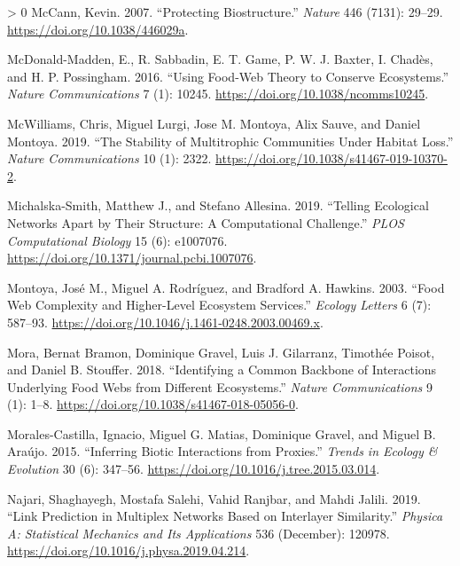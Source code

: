 \documentclass[11pt]{article}
\newlength{\cslhangindent}
\newenvironment{CSLReferences}[3] %
 {%
  \setlength{\parindent}{0pt}
  \ifodd #1 \everypar{\setlength{\hangindent}{\cslhangindent}}\ignorespaces\fi
  \ifnum #2 > 0
  \setlength{\parskip}{#2\baselineskip}
  \fi
 }%
 {}
\begin{document}
\begin{CSLReferences}{1}{0}
\leavevmode\hypertarget{ref-McCann2007ProBio}{}%
McCann, Kevin. 2007. {``Protecting Biostructure.''} \emph{Nature} 446
(7131): 29--29. \url{https://doi.org/10.1038/446029a}.

\leavevmode\hypertarget{ref-McDonald-Madden2016UsiFoo}{}%
McDonald-Madden, E., R. Sabbadin, E. T. Game, P. W. J. Baxter, I.
Chadès, and H. P. Possingham. 2016. {``Using Food-Web Theory to Conserve
Ecosystems.''} \emph{Nature Communications} 7 (1): 10245.
\url{https://doi.org/10.1038/ncomms10245}.

\leavevmode\hypertarget{ref-McWilliams2019StaMul}{}%
McWilliams, Chris, Miguel Lurgi, Jose M. Montoya, Alix Sauve, and Daniel
Montoya. 2019. {``The Stability of Multitrophic Communities Under
Habitat Loss.''} \emph{Nature Communications} 10 (1): 2322.
\url{https://doi.org/10.1038/s41467-019-10370-2}.

\leavevmode\hypertarget{ref-Michalska-Smith2019TelEco}{}%
Michalska-Smith, Matthew J., and Stefano Allesina. 2019. {``Telling
Ecological Networks Apart by Their Structure: A Computational
Challenge.''} \emph{PLOS Computational Biology} 15 (6): e1007076.
\url{https://doi.org/10.1371/journal.pcbi.1007076}.

\leavevmode\hypertarget{ref-Montoya2003FooWeb}{}%
Montoya, José M., Miguel A. Rodríguez, and Bradford A. Hawkins. 2003.
{``Food Web Complexity and Higher-Level Ecosystem Services.''}
\emph{Ecology Letters} 6 (7): 587--93.
\url{https://doi.org/10.1046/j.1461-0248.2003.00469.x}.

\leavevmode\hypertarget{ref-Mora2018IdeCom}{}%
Mora, Bernat Bramon, Dominique Gravel, Luis J. Gilarranz, Timothée
Poisot, and Daniel B. Stouffer. 2018. {``Identifying a Common Backbone
of Interactions Underlying Food Webs from Different Ecosystems.''}
\emph{Nature Communications} 9 (1): 1--8.
\url{https://doi.org/10.1038/s41467-018-05056-0}.

\leavevmode\hypertarget{ref-Morales-Castilla2015InfBio}{}%
Morales-Castilla, Ignacio, Miguel G. Matias, Dominique Gravel, and
Miguel B. Araújo. 2015. {``Inferring Biotic Interactions from
Proxies.''} \emph{Trends in Ecology \& Evolution} 30 (6): 347--56.
\url{https://doi.org/10.1016/j.tree.2015.03.014}.

\leavevmode\hypertarget{ref-Najari2019LinPre}{}%
Najari, Shaghayegh, Mostafa Salehi, Vahid Ranjbar, and Mahdi Jalili.
2019. {``Link Prediction in Multiplex Networks Based on Interlayer
Similarity.''} \emph{Physica A: Statistical Mechanics and Its
Applications} 536 (December): 120978.
\url{https://doi.org/10.1016/j.physa.2019.04.214}.


\end{CSLReferences}
\end{document}
